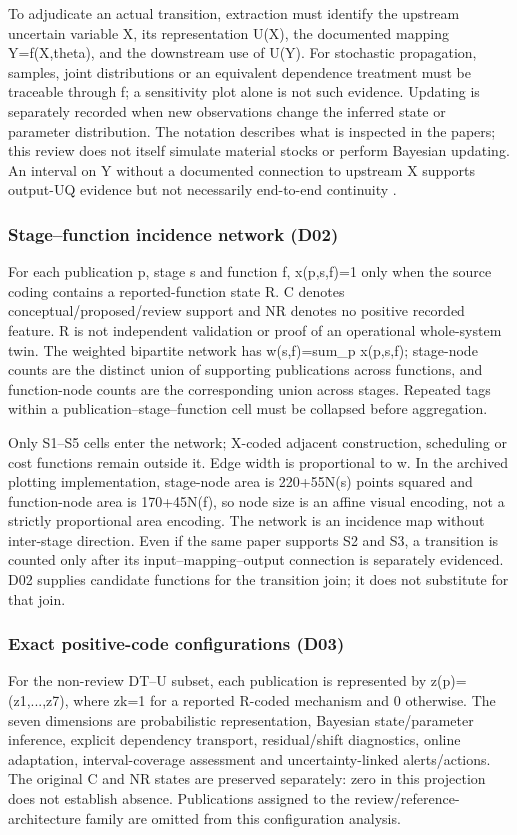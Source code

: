 To adjudicate an actual transition, extraction must identify the upstream uncertain variable X, its representation U(X), the documented mapping Y=f(X,theta), and the downstream use of U(Y). For stochastic propagation, samples, joint distributions or an equivalent dependence treatment must be traceable through f; a sensitivity plot alone is not such evidence. Updating is separately recorded when new observations change the inferred state or parameter distribution. The notation describes what is inspected in the papers; this review does not itself simulate material stocks or perform Bayesian updating. An interval on Y without a documented connection to upstream X supports output-UQ evidence but not necessarily end-to-end continuity \citep{I25,I33}.

\subsubsection{Stage–function incidence network (D02)}
For each publication p, stage s and function f, x(p,s,f)=1 only when the source coding contains a reported-function state R. C denotes conceptual/proposed/review support and NR denotes no positive recorded feature. R is not independent validation or proof of an operational whole-system twin. The weighted bipartite network has w(s,f)=sum\_p x(p,s,f); stage-node counts are the distinct union of supporting publications across functions, and function-node counts are the corresponding union across stages. Repeated tags within a publication–stage–function cell must be collapsed before aggregation.

Only S1–S5 cells enter the network; X-coded adjacent construction, scheduling or cost functions remain outside it. Edge width is proportional to w. In the archived plotting implementation, stage-node area is 220+55N(s) points squared and function-node area is 170+45N(f), so node size is an affine visual encoding, not a strictly proportional area encoding. The network is an incidence map without inter-stage direction. Even if the same paper supports S2 and S3, a transition is counted only after its input–mapping–output connection is separately evidenced. D02 supplies candidate functions for the transition join; it does not substitute for that join.

\subsubsection{Exact positive-code configurations (D03)}
For the non-review DT–U subset, each publication is represented by z(p)=(z1,...,z7), where zk=1 for a reported R-coded mechanism and 0 otherwise. The seven dimensions are probabilistic representation, Bayesian state/parameter inference, explicit dependency transport, residual/shift diagnostics, online adaptation, interval-coverage assessment and uncertainty-linked alerts/actions. The original C and NR states are preserved separately: zero in this projection does not establish absence. Publications assigned to the review/reference-architecture family are omitted from this configuration analysis.

